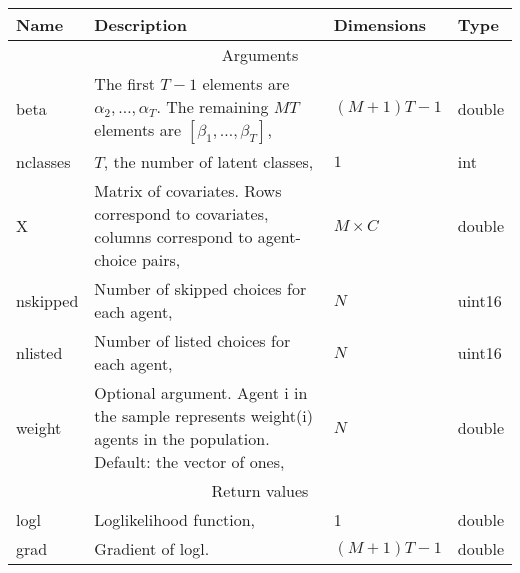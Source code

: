 \documentclass[12pt]{article}
\begin{document}
\begin{tabular}{lp{}ll}\\\hline\hline
	Name 		& Description & Dimensions & Type\\\hline
	\multicolumn{4}{c}{Arguments}\\\hline
	beta 		& The first $T-1$ elements are $\alpha_2,\dots,\alpha_T$. The remaining $MT$ elements are $[\beta_1,\dots,\beta_T]$, & $(M+1)T-1$ & double\\
	nclasses    & $T$, the number of latent classes, & $1$ & int \\
	X 			& Matrix of covariates. Rows correspond to covariates, columns correspond to agent-choice pairs, & $M\times C$ & double \\
	nskipped 	& Number of skipped choices for each agent, & $N$ & uint16 \\
	nlisted 	& Number of listed choices for each agent, & $N$ & uint16 \\
	weight		& Optional argument. Agent i in the sample represents weight(i) agents in the population. Default: the vector of ones, & $N$ & double\\\hline
	
	\multicolumn{4}{c}{Return values}\\\hline
	logl		& Loglikelihood function, & 1 & double\\
	grad		& Gradient of logl. & $(M+1)T-1$ & double\\\hline\hline
\end{tabular}
\end{document}
